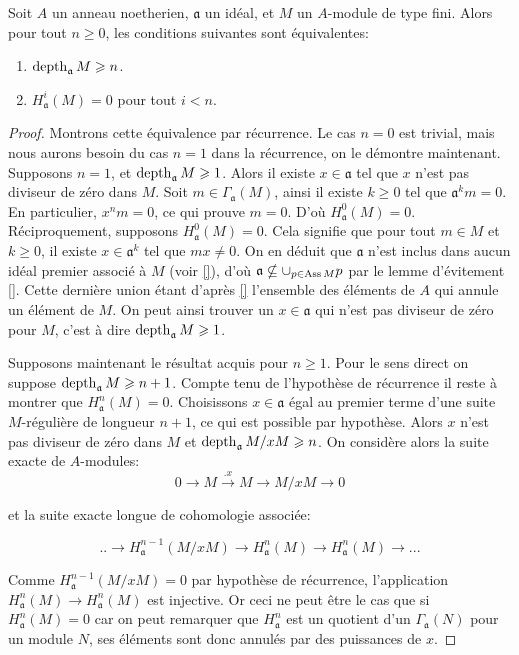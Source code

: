\begin{prop}
Soit $A$ un anneau noetherien, $\mathfrak{a}$ un idéal, et $M$ un $A$-module de type fini. Alors pour tout $n\geq 0$, les conditions suivantes sont équivalentes:
\begin{enumerate}
\item $\operatorname{depth}_\mathfrak{a} M\geqslant n$.
\item $H_\mathfrak{a}^i(M)=0$ pour tout $i<n$.
\end{enumerate}
\end{prop}
\begin{proof}
Montrons cette équivalence par récurrence. Le cas $n=0$ est trivial, mais nous aurons besoin du cas $n=1$ dans la récurrence, on le démontre maintenant. Supposons $n=1$, et $\operatorname{depth}_\mathfrak{a} M\geqslant 1$. Alors il existe $x\in\mathfrak{a}$ tel que $x$ n'est pas diviseur de zéro dans $M$. Soit $m\in \Gamma_ \mathfrak{a}(M)$, ainsi il existe $k\geq 0$ tel que $\mathfrak{a}^k m=0$. En particulier, $x^nm=0$, ce qui prouve $m=0$. D'où $H^0_\mathfrak{a}(M)=0$. Réciproquement, supposons $H^0_\mathfrak{a}(M)=0$. Cela signifie que pour tout $m\in M$ et $k\geq 0$, il existe $x\in \mathfrak{a}^k$ tel que $mx\neq 0$. On en déduit que $\mathfrak{a}$ n'est inclus dans aucun idéal premier associé à $M$ (voir \ref{}), d'où $\mathfrak{a}\nsubseteq \cup_{p\in \operatorname{Ass} M}p$ par le lemme d'évitement \ref{}. Cette dernière union étant d'après \ref{} l'ensemble des éléments de $A$ qui annule un élément de $M$. On peut ainsi trouver un $x\in \mathfrak{a}$ qui n'est pas diviseur de zéro pour $M$, c'est à dire $\operatorname{depth}_\mathfrak{a}M\geqslant 1$.

Supposons maintenant le résultat acquis pour $n\geq 1$. Pour le sens direct on suppose $\operatorname{depth}_\mathfrak{a} M\geqslant n+1$. Compte tenu de l'hypothèse de récurrence il reste à montrer que $H^n_\mathfrak{a}(M)=0$. Choisissons $x\in \mathfrak{a}$ égal au premier terme d'une suite $M$-régulière de longueur $n+1$, ce qui est possible par hypothèse. Alors $x$ n'est pas diviseur de zéro dans $M$ et $\operatorname{depth}_\mathfrak{a} M/xM \geqslant n$. On considère alors la suite exacte de $A$-modules:
$$0\rightarrow M \xrightarrow{.x} M\rightarrow M/xM\rightarrow 0$$

\noindent et la suite exacte longue de cohomologie associée:

$$..\rightarrow H^{n-1}_\mathfrak{a}(M/xM) \rightarrow H^n_\mathfrak{a}(M) \rightarrow  H^n_\mathfrak{a}(M) \rightarrow ...$$

\noindent Comme $H^{n-1}_\mathfrak{a}(M/xM)=0$ par hypothèse de récurrence, l'application $H^n_\mathfrak{a}(M) \rightarrow  H^n_\mathfrak{a}(M)$ est injective. Or ceci ne peut être le cas que si $H^n_\mathfrak{a}(M)=0$ car on peut remarquer que $H^n_\mathfrak{a}$ est un quotient d'un $\Gamma_\mathfrak{a}(N)$ pour un module $N$, ses éléments sont donc annulés par des puissances de $x$. 


\end{proof}
